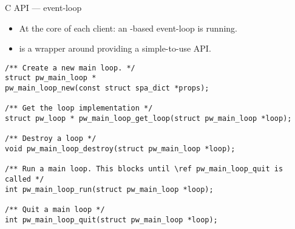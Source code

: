\begin{frame}[fragile]{C API — event-loop}
  \begin{itemize}
  \item At the core of each client: an -based event-loop
    is running.
  \item {} is a wrapper around 
    providing a simple-to-use API.
  \end{itemize}

      \begin{block}{}
        \fontsize{9}{9}\selectfont
          \begin{verbatim}
/** Create a new main loop. */
struct pw_main_loop *
pw_main_loop_new(const struct spa_dict *props);

/** Get the loop implementation */
struct pw_loop * pw_main_loop_get_loop(struct pw_main_loop *loop);

/** Destroy a loop */
void pw_main_loop_destroy(struct pw_main_loop *loop);

/** Run a main loop. This blocks until \ref pw_main_loop_quit is called */
int pw_main_loop_run(struct pw_main_loop *loop);

/** Quit a main loop */
int pw_main_loop_quit(struct pw_main_loop *loop);
          \end{verbatim}
      \end{block}
\end{frame}



